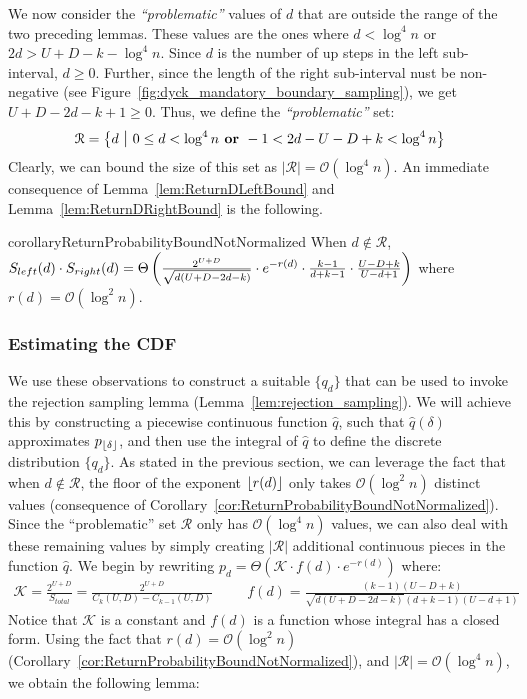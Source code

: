 We now consider the \emph{``problematic''} values of $d$ that are outside the range of the two preceding lemmas.
These values are the ones where $d < \log^4 n$ or $2d > U+D-k-\log^4 n$.
Since $d$ is the number of up steps in the left sub-interval, $d \ge 0$.
Further, since the length of the right sub-interval nust be non-negative (see Figure~\ref{fig:dyck_mandatory_boundary_sampling}),
we get $U+D-2d-k+1 \ge 0$.
Thus, we define the \emph{``problematic''} set:
\begin{align}
\label{eq:SetDefinition}
    \mathcal R = \left\{ d\ \mathlarger|\ 0\le d < \log^4 n \textrm{\textbf{\ or\ }} -1 < 2d-U-D+k < \log^4 n \right\}
\end{align}
Clearly, we can bound the size of this set as $|\mathcal R| = \mathcal O(\log^4 n)$.
An immediate consequence of Lemma~\ref{lem:ReturnDLeftBound} and Lemma~\ref{lem:ReturnDRightBound} is the following.

\begin{restatable}{corollary}{ReturnProbabilityBoundNotNormalized}
\label{cor:ReturnProbabilityBoundNotNormalized}
When $d\not \in \mathcal R$,
$S_{left}(d)\cdot S_{right}(d)
= \Theta\left( \frac{2^{U+D}}{\sqrt{d(U+D-2d-k)}}\cdot \mathlarger e^{-r(d)} \cdot \frac{k-1}{d+k-1}\cdot\frac{U-D+k}{U-d+1}\right)$
where $r(d)=\mathcal O(\log^2 n)$.
\end{restatable}



\subsubsection{Estimating the CDF}
\label{sec:estimating_the_cdf}
We use these observations to construct a suitable $\{q_d\}$ that can be used to invoke the rejection sampling lemma (Lemma~\ref{lem:rejection_sampling}).
We will achieve this by constructing a piecewise continuous function $\hat q$,
such that $\hat q(\delta)$ approximates $p_{\lfloor\delta\rfloor}$, and then use the integral of $\hat q$ to define the discrete distribution $\{q_d\}$.
As stated in the previous section, we can leverage the fact that when $d \not \in \mathcal R$,
the floor of the exponent $\lfloor r(d)\rfloor$ only takes $\mathcal O(\log^2 n)$ distinct values
(consequence of Corollary~\ref{cor:ReturnProbabilityBoundNotNormalized}).
Since the ``problematic'' set $\mathcal R$ only has $\mathcal O(\log^4 n)$ values,
we can also deal with these remaining values by simply creating $|\mathcal R|$ additional continuous pieces in the function $\hat q$.
We begin by rewriting $p_d = \Theta\left(\mathcal K \cdot f(d)\cdot e^{-r(d)}\right)$ where:
{\small
    \begin{align}
    \label{eq:dyck_integrable_function}
        \mathcal K = \frac{2^{U+D}}{S_{total}} = \frac{2^{U+D}}{C_k(U,D)-C_{k-1}(U,D)}\ \ \ \
        &&f(d) = \frac{(k-1)(U-D+k)}{\sqrt{d(U+D-2d-k)}(d+k-1)(U-d+1)}
    \end{align}}
Notice that $\mathcal K$ is a constant and $f(d)$ is a function whose integral has a closed form.
Using the fact that $r(d) = \mathcal O(\log^2 n)$ (Corollary~\ref{cor:ReturnProbabilityBoundNotNormalized}),
and $|\mathcal R| = \mathcal O(\log^4 n)$, we obtain the following lemma:

